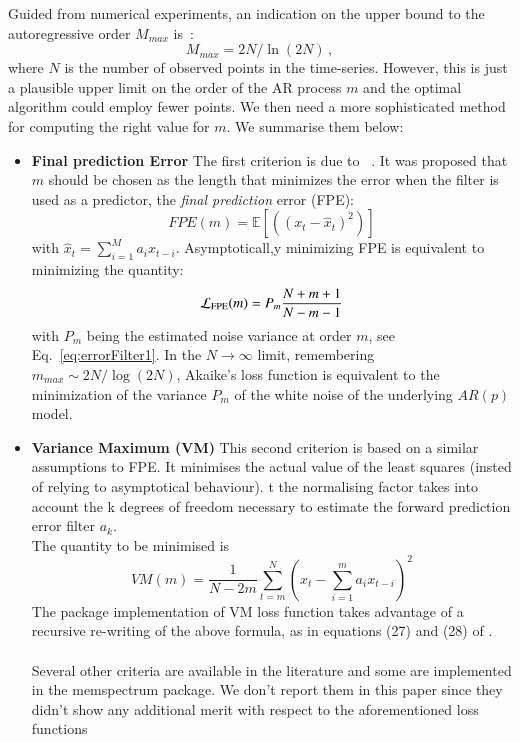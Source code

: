 \documentclass{aa}
\begin{document}
Guided from numerical experiments, an indication on the upper bound to the autoregressive order $M_{max}$ is~\citep{doi:10.1190/1.1440902}:
\begin{equation}\label{eq:MMAx}
M_{max} = 2N / \ln{(2N)}\,,
\end{equation}
where $N$ is the number of observed points in the time-series.
However, this is just a plausible upper limit on the order of the AR process $m$ and the optimal algorithm could employ fewer points.
We then need a more sophisticated method for computing the right value for $m$.
We summarise them below:

\begin{itemize}
\item \textbf{Final prediction Error} 
The first criterion is due to ~\citet{Akaike1970StatisticalPI}. It was proposed that $m$ should be chosen as the 
length that minimizes the error when the filter is used as a predictor, the \emph{final prediction} error (FPE): 
\begin{equation}
    FPE(m) = \mathbb{E}\left[ \left((x_t - \hat x_t) ^ 2\right) \right]
\end{equation}
with $\hat{x}_t = \sum_{i = 1}^M a_i x_{t - i}$.
Asymptoticall,y minimizing FPE is equivalent to minimizing the quantity: 
\begin{equation}
    \mathcal{L}_{\rm FPE}(m) = P_{m} \frac{N + m + 1}{N - m - 1}
\end{equation}
with $P_m$ being the estimated noise variance at order $m$, see Eq.~\eqref{eq:errorFilter1}. In the $N \to \infty$ limit, 
remembering $m_{max} \sim 2N / \log(2N)$, Akaike's loss function is equivalent to the minimization of the variance $P_m$ of the white noise of the underlying $AR(p)$ model. 

\item \textbf{Variance Maximum (VM)}
This second criterion \cite{kay1988modern} is based on a similar assumptions to FPE. It minimises the actual value of the least squares (insted of relying to asymptotical behaviour). t the normalising factor takes into account the k degrees of freedom necessary to estimate the forward prediction error filter $a_k$.\\ The quantity to be minimised is
\begin{equation}
VM(m) = \frac{1}{N - 2m}\sum_{t=m}^N\left(x_t - \sum_{i=1}^m a_i x_{t-i} \right)^{2}
\end{equation}
The package implementation of VM loss function takes advantage of a recursive re-writing of the above formula, as in equations (27) and (28) of \citet{Cuoco_2001}.  \\ \\

Several other criteria are available in the literature \citet{doi:10.1029/WR018i004p01097} \citet{10.1214/aos/1176349858} and some are implemented in the memspectrum package. We don't report them in this paper since they didn't show any additional merit with respect to the aforementioned loss functions \\
\end{itemize}
\end{document}
